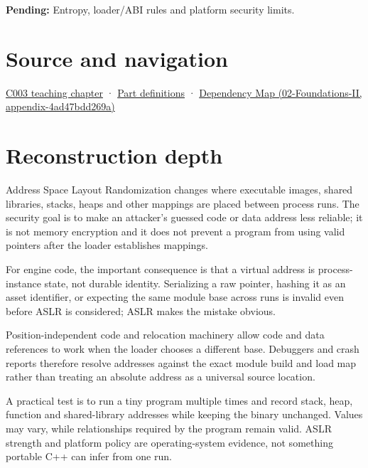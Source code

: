 \textbf{Pending:} Entropy, loader/ABI rules and platform security limits.

\section{Source and navigation}\label{appendix-78cb248c8355-source-and-navigation}

\href{Continuous\%20Notes/Computing\%20Foundations\%20-\%20From\%20Bits\%20to\%20C++\%20and\%20Systems\%20APIs\#Where\%20the\%20bytes\%20live}{C003 teaching chapter} · \hyperref[appendix-fd090d982a15-m003---parts-41-60]{Part definitions} · \href{../02-Foundations-II/main.pdf\#nameddest=appendix-4ad47bdd269a}{Dependency Map (02-Foundations-II, appendix-4ad47bdd269a)}

\section{Reconstruction depth}\label{appendix-78cb248c8355-reconstruction-depth}

Address Space Layout Randomization changes where executable images, shared libraries, stacks, heaps and other mappings are placed between process runs. The security goal is to make an attacker's guessed code or data address less reliable; it is not memory encryption and it does not prevent a program from using valid pointers after the loader establishes mappings.

For engine code, the important consequence is that a virtual address is process-instance state, not durable identity. Serializing a raw pointer, hashing it as an asset identifier, or expecting the same module base across runs is invalid even before ASLR is considered; ASLR makes the mistake obvious.

Position-independent code and relocation machinery allow code and data references to work when the loader chooses a different base. Debuggers and crash reports therefore resolve addresses against the exact module build and load map rather than treating an absolute address as a universal source location.

A practical test is to run a tiny program multiple times and record stack, heap, function and shared-library addresses while keeping the binary unchanged. Values may vary, while relationships required by the program remain valid. ASLR strength and platform policy are operating-system evidence, not something portable C++ can infer from one run.
